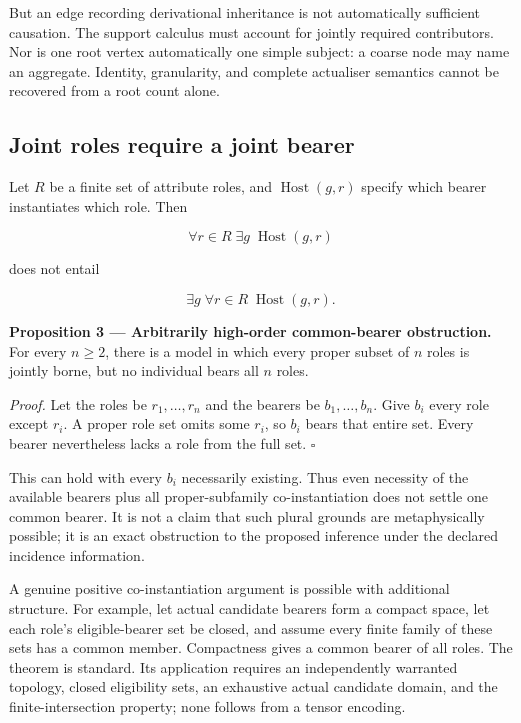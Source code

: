 \documentclass[11pt,a4paper]{article}
\begin{document}
But an edge recording derivational inheritance is not automatically
sufficient causation. The support calculus must account for jointly
required contributors. Nor is one root vertex automatically one simple
subject: a coarse node may name an aggregate. Identity, granularity, and
complete actualiser semantics cannot be recovered from a root count
alone.

\subsection{Joint roles require a joint
bearer}\label{joint-roles-require-a-joint-bearer}

Let \(R\) be a finite set of attribute roles, and
\(\operatorname{Host}(g,r)\) specify which bearer instantiates which
role. Then

\nopagebreak[4]

\[
\forall r\in R\;\exists g\;\operatorname{Host}(g,r)
\]

does not entail

\nopagebreak[4]

\[
\exists g\;\forall r\in R\;\operatorname{Host}(g,r).
\]


\textbf{Proposition 3 --- Arbitrarily high-order common-bearer
obstruction.} For every \(n\ge2\), there is a model in which every
proper subset of \(n\) roles is jointly borne, but no individual bears
all \(n\) roles.

\emph{Proof.} Let the roles be \(r_1,\ldots,r_n\) and the bearers be
\(b_1,\ldots,b_n\). Give \(b_i\) every role except \(r_i\). A proper
role set omits some \(r_i\), so \(b_i\) bears that entire set. Every
bearer nevertheless lacks a role from the full set. \(\square\)

This can hold with every \(b_i\) necessarily existing. Thus even
necessity of the available bearers plus all proper-subfamily
co-instantiation does not settle one common bearer. It is not a claim
that such plural grounds are metaphysically possible; it is an exact
obstruction to the proposed inference under the declared incidence
information.

A genuine positive co-instantiation argument is possible with additional
structure. For example, let actual candidate bearers form a compact
space, let each role's eligible-bearer set be closed, and assume every
finite family of these sets has a common member. Compactness gives a
common bearer of all roles. The theorem is standard. Its application
requires an independently warranted topology, closed eligibility sets,
an exhaustive actual candidate domain, and the finite-intersection
property; none follows from a tensor encoding.
\end{document}
